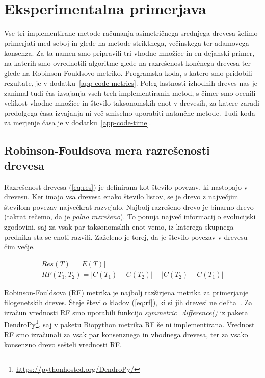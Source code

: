 \documentclass[a4paper, 12pt]{book}
\begin{document}
\chapter{Eksperimentalna primerjava}

Vse tri implementirane metode računanja asimetričnega srednjega drevesa želimo 
primerjati med seboj in glede na metode striktnega, večinskega ter adamovega 
konsenza. Za ta namen smo pripravili tri vhodne množice in en dejanski primer,
na katerih smo ovrednotili algoritme glede na razrešenost končnega drevesa ter 
glede na Robinson-Fouldsovo metriko. 
Programska koda, s katero smo pridobili rezultate, je v 
dodatku~\ref{app-code-metrics}. Poleg lastnosti izhodnih dreves nas je zanimal 
tudi čas izvajanja vseh treh implementiranih metod, s čimer smo ocenili velikost 
vhodne množice in število taksonomskih enot v drevesih, za katere zaradi 
predolgega časa izvajanja ni več smiselno uporabiti  natančne metode. Tudi koda za 
merjenje časa je v dodatku~\ref{app-code-time}.

\section[Robinson-Fouldsova mera razrešenosti drevesa]{Robinson-Fouldsova mera razrešenosti\\ drevesa}
Razrešenost drevesa (\ref{eq:res}) je definirana kot število povezav, ki 
nastopajo v drevesu. Ker imajo vsa drevesa enako število listov, se je drevo z 
največjim številom povezav največkrat razvejalo. Najbolj razrešeno drevo je 
binarno drevo (takrat rečemo, da je {\it polno razrešeno}). To ponuja največ 
informacij o evolucijski zgodovini, saj za vsak par taksonomskih enot vemo, 
iz katerega skupnega prednika sta se enoti razvili. Zaželeno je torej, da 
je število povezav v drevesu čim večje.

\begin{align}
	Res(T) = \left|E(T)\right| \label{eq:res} ~~~~~~~~~~~~~~~~~~~~~ \\
	RF(T_1, T_2) = \left|C(T_1) - C(T_2)\right| + \left|C(T_2) - C(T_1)\right|  \label{eq:rf}
\end{align}

\noindent Robinson-Fouldsova (RF) metrika je najbolj razširjena metrika za primerjanje 
filogenetskih dreves. Šteje število kladov (\ref{eq:rf}), ki si jih drevesi 
ne delita~\cite{rf}. Za izračun vrednosti RF smo uporabili funkcijo 
{\it symmetric\_difference()} iz paketa 
DendroPy\footnote{\url{https://pythonhosted.org/DendroPy/}}, saj v paketu 
Biopython metrika RF še ni implementirana. Vrednost RF smo izračunali za 
vsak par konsenznega in vhodnega drevesa, ter za vsako konsenzno drevo sešteli
vrednosti RF.
\end{document}
